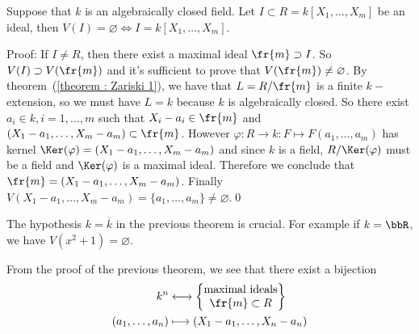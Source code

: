 \begin{dang}
    \begin{theorem}\label{theorem : Hilbert's zero theorem}
        Suppose that $k$ is an algebraically closed field.
        Let $I\subset R =k[X_1,\dots, X_m]$ be an ideal, then $V(I)=\varnothing\iff I = k[X_1,\dots, X_m]$.
    \end{theorem}
\end{dang}
Proof: If $I\neq R$, then there exist a maximal ideal $\fr{m}\supset I$. So $V(I)\supset V(\fr{m})$ and it's sufficient to 
prove that $V(\fr{m})\neq\varnothing$. By theorem~(\ref{theorem : Zariski 1}), we have that $L=R/\fr{m}$ is a finite 
$k-$extension, so we must have $L=k$ because $k$ is algebraically closed. So there exist $a_i\in k,i=1,\dots,m$ such that 
$X_i - a_i\in\fr{m}$ and $(X_1-a_1,\dots, X_m-a_m)\subset \fr{m}$. However $\varphi: R\to k:F\mapsto F(a_1,\dots,a_m)$ has kernel 
$\Ker(\varphi)=(X_1-a_1,\dots, X_m-a_m)$ and since $k$ is a field, $R/\Ker(\varphi)$ must be  a field and 
$\Ker(\varphi)$ is a maximal ideal. Therefore we conclude that $\fr{m}=(X_1-a_1,\dots, X_m-a_m)$. Finally
$V(X_1-a_1,\dots,X_m-a_m)=\{a_1,\dots,a_m\}\neq\varnothing$.\qed

\begin{remark}
    The hypothesis $k=\overline{k}$ in the previous theorem is crucial. For example if $k=\bbR$, we have 
    $V(x^2+1)=\varnothing$.
\end{remark}

\begin{remark}
    From the proof of the previous theorem, we see that there exist a bijection 
    \begin{equation}
        \begin{split}
            k^n &\longleftrightarrow \left\{\begin{matrix}\text{maximal ideals}\\\fr{m}\subset R\end{matrix}\right\}\\
           (a_1,\dots,a_n)&\longmapsto (X_1-a_1,\dots, X_n-a_n)
        \end{split}
    \end{equation}
\end{remark}